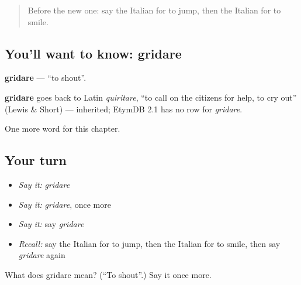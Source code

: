 \label{lesson:IT-C140-gridare}



\begin{quote}
Before the new one: say the Italian for to jump, then the Italian for to smile.
\end{quote}

\subsection*{You'll want to know: gridare}
\textbf{gridare} — \textquotedblleft{}to shout\textquotedblright{}.

\begin{cousinweb}
\textbf{gridare} goes back to Latin \emph{quiritare}, \textquotedblleft{}to call on the citizens for help, to cry out\textquotedblright{} (Lewis \& Short) — inherited; EtymDB 2.1 has no row for \emph{gridare}.
\end{cousinweb}

\begin{grammarlens}[title={What you've built}]
One more word for this chapter.
\end{grammarlens}

\subsection*{Your turn}
\begin{itemize}
\raggedright
  \item \emph{Say it:} \emph{gridare}
  \item \emph{Say it:} \emph{gridare}, once more
  \item \emph{Say it:} say \emph{gridare}
  \item \emph{Recall:} say the Italian for to jump, then the Italian for to smile, then say \emph{gridare} again
\end{itemize}

\begin{tcolorbox}[breakable,colback=teal!4,colframe=teal!35!black,title={Before you move on}]
What does gridare mean? (\textquotedblleft{}To shout\textquotedblright{}.) Say it once more.
\end{tcolorbox}
